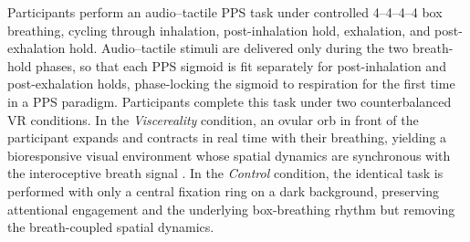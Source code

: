 Participants perform an audio--tactile PPS task \citep{Canzoneri2012, teneggi2013social} under controlled 4--4--4--4 box breathing, cycling through inhalation, post-inhalation hold, exhalation, and post-exhalation hold. Audio--tactile stimuli are delivered only during the two breath-hold phases, so that each PPS sigmoid is fit separately for post-inhalation and post-exhalation holds, phase-locking the sigmoid to respiration for the first time in a PPS paradigm. Participants complete this task under two counterbalanced VR conditions. In the \emph{Viscereality} condition, an ovular orb in front of the participant expands and contracts in real time with their breathing, yielding a bioresponsive visual environment whose spatial dynamics are synchronous with the interoceptive breath signal \citep{Goral2024}. In the \emph{Control} condition, the identical task is performed with only a central fixation ring on a dark background, preserving attentional engagement and the underlying box-breathing rhythm but removing the breath-coupled spatial dynamics.

